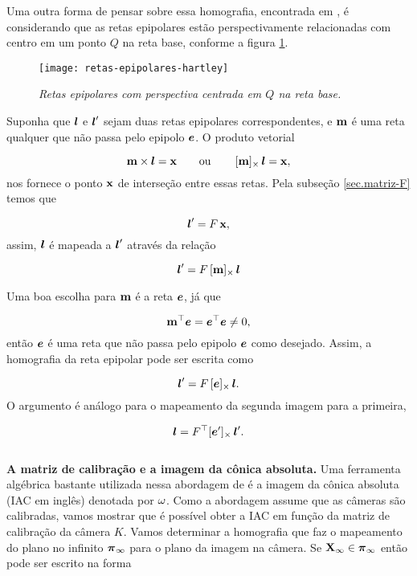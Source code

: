 Uma outra forma de pensar sobre essa homografia, encontrada em \cite{Hartley2004}, é considerando que as retas epipolares estão perspectivamente relacionadas com centro em um ponto $Q$ na reta base, conforme a figura \ref{fig.retas-epi-hartley}.

\begin{figure}[!htb]
\centering
\texttt{[image: retas-epipolares-hartley]}
\caption{\textit{Retas epipolares com perspectiva centrada em $Q$ na reta base.}}
\label{fig.retas-epi-hartley}
\end{figure}


Suponha que $\boldsymbol{l}$ e $\boldsymbol{l}'$ sejam duas retas epipolares correspondentes, e ${\bf m}$ é uma reta qualquer que não passa pelo epipolo $\boldsymbol{e}$. O produto vetorial 

\begin{equation}
{\bf m}\times\boldsymbol{l}=\mathbf{x}\qquad\text{ou}\qquad\,[{\bf m}]_\times\,\boldsymbol{l}=\mathbf{x},
\end{equation}
nos fornece o ponto $\mathbf{x}$ de interseção entre essas retas. Pela subseção \ref{sec.matriz-F} temos que

\begin{equation*}
\boldsymbol{l}'=F\,\mathbf{x},
\end{equation*} 
assim, $\boldsymbol{l}$ é mapeada a $\boldsymbol{l}'$ através da relação 

\begin{equation*}
\boldsymbol{l}'=F\,[{\bf m}]_\times\,\boldsymbol{l}
\end{equation*}


Uma boa escolha para ${\bf m}$ é a reta $\boldsymbol{e}$, já que

\begin{equation*}
{\bf m}^\top\boldsymbol{e}=\boldsymbol{e}^\top\boldsymbol{e}\neq0,
\end{equation*}
então $\boldsymbol{e}$ é uma reta que não passa pelo epipolo $\boldsymbol{e}$ como desejado. Assim, a homografia da reta epipolar pode ser escrita como 

\begin{equation*}
\boldsymbol{l}'=F\,[\boldsymbol{e}]_\times\,\boldsymbol{l}.
\end{equation*}
O argumento é análogo para o mapeamento da segunda imagem para a primeira,

\begin{equation*}
\boldsymbol{l}=F^\top [\boldsymbol{e}']_\times\,\boldsymbol{l}'.
\end{equation*}\\

{\bf A matriz de calibração e a imagem da cônica absoluta.} Uma ferramenta algébrica bastante utilizada nessa abordagem de \citep{2503343} é a imagem da cônica absoluta (IAC em inglês) denotada por ${\bf \omega}$. Como a abordagem assume que as câmeras são calibradas, vamos mostrar que é possível obter a IAC em função da matriz de calibração da câmera $K$. Vamos determinar a homografia que faz o mapeamento do plano no infinito $\boldsymbol{\pi}_\infty$ para o plano da imagem na câmera. Se $\mathbf{X}_\infty\in\boldsymbol{\pi}_\infty$ então pode ser escrito na forma

